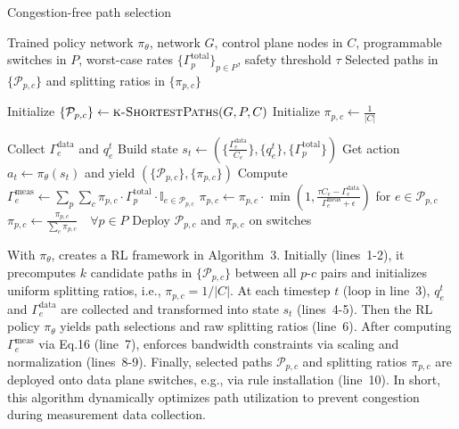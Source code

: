 \begin{algorithm}[t]
\caption{Congestion-free path selection}
\begin{algorithmic}[1]
\Require Trained policy network $\pi_\theta$, network $G$, 
         control plane nodes in $C$, programmable switches in $P$, 
         worst-case rates $\{\Gamma_p^{\text{total}}\}_{p \in P}$, 
         safety threshold $\tau$
\Ensure Selected paths in $\{\mathcal{P}_{p,c}\}$ and splitting ratios in $\{\pi_{p,c}\}$

\State Initialize $\{\mathcal{P}_{p,c}\} \gets \textsc{k-ShortestPaths}(G, P, C)$ %
\State Initialize $\pi_{p,c} \gets \frac{1}{|C|}$ 

\Loop {}
  \State Collect $\Gamma_e^{\text{data}}$ and $q_e^t$
  \State Build state $s_t \gets \left( \{ \frac{\Gamma_e^{\text{data}}}{C_e} \}, \{q_e^t\}, \{\Gamma_p^{\text{total}}\} \right)$
  \State Get action $a_t \gets \pi_\theta(s_t)$ and yield $(\{\mathcal{P}_{p,c}\}, \{\pi_{p,c}\})$ 
  \State Compute $\Gamma_e^{\text{meas}} \gets \sum_{p} \sum_{c} \pi_{p,c} \cdot \Gamma_p^{\text{total}} \cdot \mathbb{I}_{e \in \mathcal{P}_{p,c}}$
  \State $\pi_{p,c} \gets \pi_{p,c} \cdot \min\left(1, \frac{\tau C_e - \Gamma_e^{\text{data}}}{\Gamma_e^{\text{meas}} + \epsilon}\right)$ for $e \in \mathcal{P}_{p,c}$
  \State $\pi_{p,c} \gets \frac{\pi_{p,c}}{\sum_c \pi_{p,c}} \quad \forall p \in P$ 
  \State Deploy $\mathcal{P}_{p,c}$ and $\pi_{p,c}$ on switches
\EndLoop
\end{algorithmic}
\end{algorithm}

With $\pi_\theta$, \sysname creates a RL framework in Algorithm~3. Initially (lines~1-2), it precomputes $k$ candidate paths in $\{\mathcal{P}_{p,c}\}$ between all $p$-$c$ pairs and initializes uniform splitting ratios, i.e., $\pi_{p,c} = 1/|C|$. At each timestep $t$ (loop in line~3), $q_e^t$ and $\Gamma_e^{\text{data}}$ are collected and transformed into state $s_t$ (lines~4-5). Then the RL policy $\pi_\theta$ yields path selections and raw splitting ratios (line~6). 
After computing $\Gamma_e^{\text{meas}}$ via Eq.16 (line~7), \sysname enforces bandwidth constraints via scaling and normalization (lines~8-9). 
Finally, selected paths $\mathcal{P}_{p,c}$ and splitting ratios $\pi_{p,c}$ are deployed onto data plane switches, e.g., via rule installation (line~10). In short, this algorithm dynamically optimizes path utilization to prevent congestion during measurement data collection.

